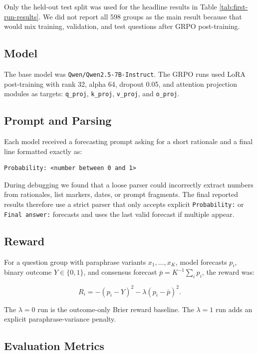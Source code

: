 \documentclass[11pt]{article}
\begin{document}
Only the held-out test split was used for the headline results in Table
\ref{tab:first-run-results}. We did not report all 598 groups as the main result
because that would mix training, validation, and test questions after GRPO
post-training.

\subsection*{Model}

The base model was \texttt{Qwen/Qwen2.5-7B-Instruct}. The GRPO runs used LoRA
post-training with rank 32, alpha 64, dropout 0.05, and attention projection
modules as targets: \texttt{q\_proj}, \texttt{k\_proj}, \texttt{v\_proj}, and
\texttt{o\_proj}.

\subsection*{Prompt and Parsing}

Each model received a forecasting prompt asking for a short rationale and a final
line formatted exactly as:

\begin{verbatim}
Probability: <number between 0 and 1>
\end{verbatim}

During debugging we found that a loose parser could incorrectly extract numbers
from rationales, list markers, dates, or prompt fragments. The final reported
results therefore use a strict parser that only accepts explicit
\texttt{Probability:} or \texttt{Final answer:} forecasts and uses the last valid
forecast if multiple appear.

\subsection*{Reward}

For a question group with paraphrase variants $x_1, \ldots, x_K$, model forecasts
$p_i$, binary outcome $Y \in \{0,1\}$, and consensus forecast
$\bar{p}=K^{-1}\sum_i p_i$, the reward was:

\[
R_i = -(p_i - Y)^2 - \lambda (p_i - \bar{p})^2.
\]

The $\lambda=0$ run is the outcome-only Brier reward baseline. The $\lambda=1$
run adds an explicit paraphrase-variance penalty.

\subsection*{Evaluation Metrics}
\end{document}

